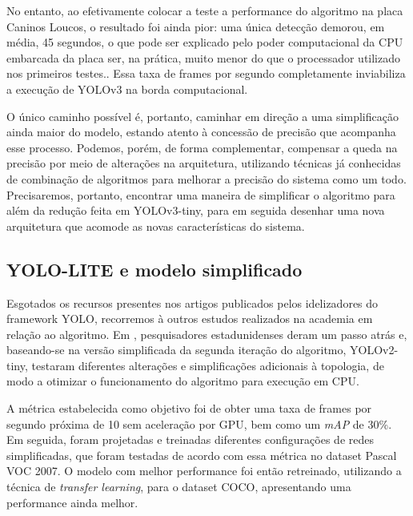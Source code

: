 \documentclass[]{politex}
\begin{document}
No entanto, ao efetivamente colocar a teste a performance do algoritmo na placa Caninos Loucos, o resultado foi ainda pior: uma única detecção demorou, em média, 45 segundos, o que pode ser explicado pelo poder computacional da CPU embarcada da placa ser, na prática, muito menor do que o processador utilizado nos primeiros testes.. Essa taxa de frames por segundo completamente inviabiliza a execução de YOLOv3 na borda computacional.

O único caminho possível é, portanto, caminhar em direção a uma simplificação ainda maior do modelo, estando atento à concessão de precisão que acompanha esse processo. Podemos, porém, de forma complementar, compensar a queda na precisão por meio de alterações na arquitetura, utilizando técnicas já conhecidas de combinação de algoritmos para melhorar a precisão do sistema como um todo. Precisaremos, portanto, encontrar uma maneira de simplificar o algoritmo para além da redução feita em YOLOv3-tiny, para em seguida desenhar uma nova arquitetura que acomode as novas características do sistema.

\subsection{YOLO-LITE e modelo simplificado}

Esgotados os recursos presentes nos artigos publicados pelos idelizadores do framework YOLO, recorremos à outros estudos realizados na academia em relação ao algoritmo. Em \citeyear{yololite} \citeauthor{yololite}, pesquisadores estadunidenses deram um passo atrás e, baseando-se na versão simplificada da segunda iteração do algoritmo, YOLOv2-tiny, testaram diferentes alterações e simplificações adicionais à topologia, de modo a otimizar o funcionamento do algoritmo para execução em CPU.

A métrica estabelecida como objetivo foi de obter uma taxa de frames por segundo próxima de 10 sem aceleração por GPU, bem como um \textit{mAP} de 30\%. Em seguida, foram projetadas e treinadas diferentes configurações de redes simplificadas, que foram testadas de acordo com essa métrica no dataset Pascal VOC 2007\cite{pascalvoc}. O modelo com melhor performance foi então retreinado, utilizando a técnica de \textit{transfer learning}, para o dataset COCO\cite{coco}, apresentando uma performance ainda melhor.
\end{document}
